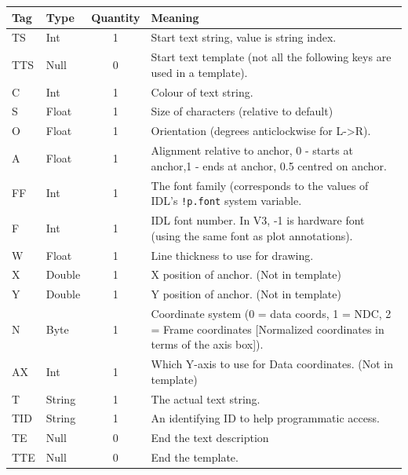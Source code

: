 \documentclass[english]{article}
\begin{document}
\begin{longtable}{|llcp{8cm}|}
\hline 
Tag&
Type&
Quantity&
Meaning\\
\hline
\endhead
\hline
\endfoot
TS& Int& 1&
Start text string, value is string index.\\
TTS& Null& 0&
Start text template (not all the following keys are used in a template).\\
\hline C& Int& 1&
Colour of text string.\\
S& Float& 1&
Size of characters (relative to default)\\
O& Float& 1&
Orientation (degrees anticlockwise for L->R).\\
A& Float& 1& Alignment relative to anchor, 0 - starts at anchor,1 -
ends at anchor,
0.5 centred on anchor.\\
FF & Int & 1 & The font family (corresponds to the values of IDL's
\texttt{!p.font} system variable.\\
F& Int& 1&
IDL font number. In V3, -1 is hardware font (using the same font as
plot annotations).\\
W& Float& 1&
Line thickness to use for drawing.\\
X& Double& 1&
X position of anchor. (Not in template)\\
Y& Double& 1&
Y position of anchor. (Not in template)\\
N& Byte& 1& Coordinate system (0 = data coords, 1 = NDC, 2 = Frame coordinates
[Normalized coordinates in terms of the axis box]).\\
AX & Int & 1 & Which Y-axis to use for Data coordinates. (Not in template)\\
T& String& 1&
The actual text string.\\
TID & String & 1 & An identifying ID to help programmatic access.\\
\hline TE& Null& 0&
End the text description\\
TTE& Null& 0&
End the template.\\
\end{longtable}
\end{document}

